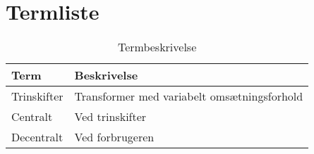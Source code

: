 

\chapter{Termliste}

\begin{table}[htbp]
	\centering
	\begin{tabular}{|l|l|}
		\hline
		\textbf{Term} 	& \textbf{Beskrivelse} \\\hline
		Trinskifter	& Transformer med variabelt omsætningsforhold \\\hline
		Centralt	& Ved trinskifter \\\hline
		Decentralt 	& Ved forbrugeren \\\hline
		
	\end{tabular}
	\caption{Termbeskrivelse}
	\label{tab:termbeskrivelsen}
	
\end{table}